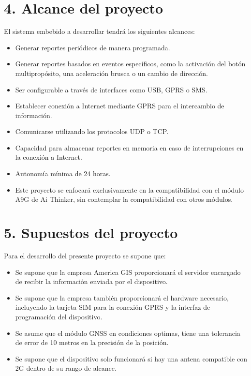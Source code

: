 \documentclass[
11pt, %
codirector, %
]{charter}
\begin{document}
\section{4. Alcance del proyecto}
\label{sec:alcance}

El sistema embebido a desarrollar tendrá los siguientes alcances:
\begin{itemize}
    \item Generar reportes periódicos de manera programada.
    \item Generar reportes basados en eventos específicos, como la activación del botón multipropósito, una aceleración brusca o un cambio de dirección.
    \item Ser configurable a través de interfaces como USB, GPRS o SMS.
    \item Establecer conexión a Internet mediante GPRS para el intercambio de información.
    \item Comunicarse utilizando los protocolos UDP o TCP.
    \item Capacidad para almacenar reportes en memoria en caso de interrupciones en la conexión a Internet.
    \item Autonomía mínima de 24 horas.
    \item Este proyecto se enfocará exclusivamente en la compatibilidad con el módulo A9G de Ai Thinker, sin contemplar la compatibilidad con otros módulos.
\end{itemize}
\pagebreak

\section{5. Supuestos del proyecto}
\label{sec:supuestos}
Para el desarrollo del presente proyecto se supone que:
\begin{itemize}
\item Se supone que la empresa America GIS proporcionará el servidor encargado de recibir la información enviada por el dispositivo. 
\item Se supone que la empresa también proporcionará el hardware necesario, incluyendo la tarjeta SIM para la conexión GPRS y la interfaz de programación del dispositivo.
\item Se asume que el módulo GNSS en condiciones optimas, tiene una tolerancia de error de 10 metros en la precisión de la posición.
\item Se supone que el dispositivo solo funcionará si hay una antena compatible con 2G dentro de su rango de alcance.
\end{itemize}
\end{document}
